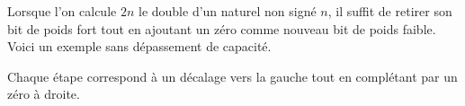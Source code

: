 Lorsque l'on calcule $2n$ le double d'un naturel non signé $n$, il suffit de retirer son bit de poids fort tout en ajoutant un zéro comme nouveau bit de poids faible. Voici un exemple sans dépassement de capacité.


\medskip


\medskip


\medskip


\medskip


\medskip


Chaque étape correspond à un décalage vers la gauche tout en complétant par un zéro à droite.